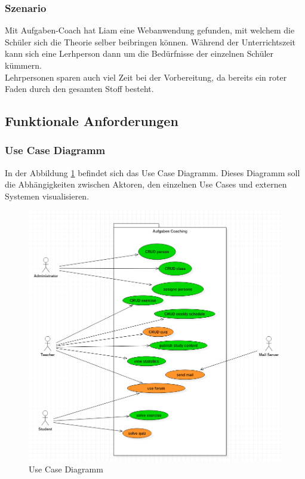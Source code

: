 \subsubsection*{Szenario}
Mit Aufgaben-Coach hat Liam eine Webanwendung gefunden, mit welchem die Schüler sich die Theorie selber beibringen können. Während der Unterrichtszeit kann sich eine Lerhperson dann um die Bedürfnisse der einzelnen Schüler kümmern. \\
Lehrpersonen sparen auch viel Zeit bei der Vorbereitung, da bereits ein roter Faden durch den gesamten Stoff besteht.

\subsection{Funktionale Anforderungen}

\subsubsection{Use Case Diagramm}
In der Abbildung \ref{uc_diagram} befindet sich das Use Case Diagramm. Dieses Diagramm soll die Abhängigkeiten zwischen Aktoren, den einzelnen Use Cases und externen Systemen visualisieren.

\begin{minipage}{\textwidth}

\begin{figure}[H]
	\includegraphics[width=\textwidth, height=\textheight, keepaspectratio]{images/UseCaseDiagramm.png}
	\caption{Use Case Diagramm}
	\label{uc_diagram}
\end{figure}

\end{minipage}


